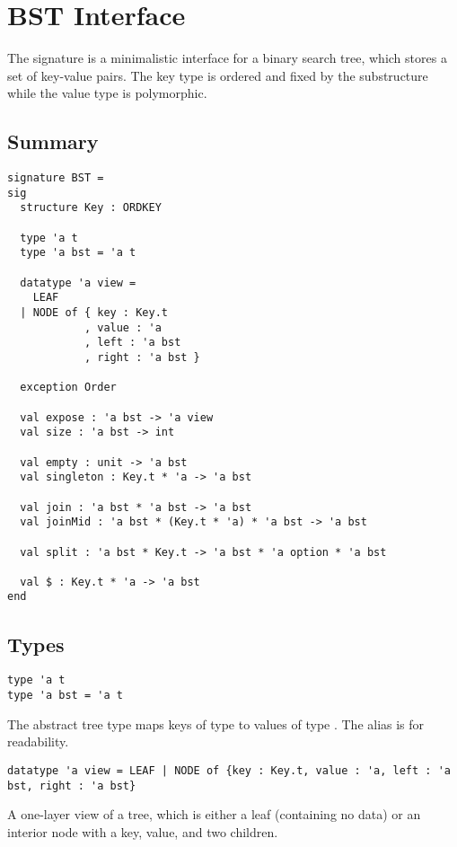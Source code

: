 \chapter{BST Interface}
\label{ch:bst-interface}
\begin{preamble}
The  signature is a minimalistic interface for a binary search tree, which
stores a set of key-value pairs. The key type is ordered and fixed by the
 substructure while the value type is polymorphic.
\end{preamble}

\section{Summary}
\begin{gram}
\begin{verbatim}
signature BST =
sig
  structure Key : ORDKEY

  type 'a t
  type 'a bst = 'a t

  datatype 'a view =
    LEAF
  | NODE of { key : Key.t
            , value : 'a
            , left : 'a bst
            , right : 'a bst }

  exception Order

  val expose : 'a bst -> 'a view
  val size : 'a bst -> int

  val empty : unit -> 'a bst
  val singleton : Key.t * 'a -> 'a bst

  val join : 'a bst * 'a bst -> 'a bst
  val joinMid : 'a bst * (Key.t * 'a) * 'a bst -> 'a bst

  val split : 'a bst * Key.t -> 'a bst * 'a option * 'a bst

  val $ : Key.t * 'a -> 'a bst
end
\end{verbatim}
\end{gram}

\section{Types}

\begin{gram}
\begin{verbatim}
type 'a t
type 'a bst = 'a t
\end{verbatim}
The abstract tree type  maps keys of type  to values of
type . The alias  is for readability.
\end{gram}

\begin{gram}
\begin{verbatim}
datatype 'a view = LEAF | NODE of {key : Key.t, value : 'a, left : 'a bst, right : 'a bst}
\end{verbatim}
A one-layer view of a tree, which is either a leaf (containing no data) or an
interior node with a key, value, and two children.
\end{gram}


